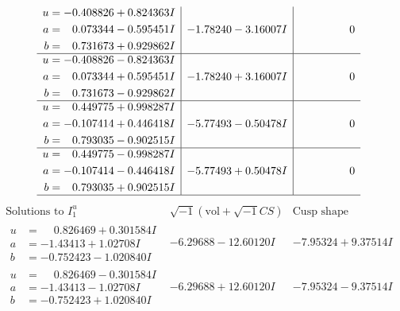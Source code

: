 \documentclass[1p]{elsarticle_modified}
\theoremstyle{definition}
\newcommand{\I}{\sqrt{-1}}
\begin{document}
$$\begin{array}{c|c|c}
\begin{aligned}
u &= -0.408826 + 0.824363 I \\
a &= \phantom{-}0.073344 - 0.595451 I \\
b &= \phantom{-}0.731673 + 0.929862 I\end{aligned}
 & -1.78240 - 3.16007 I & \phantom{-0.000000 } 0 \\ \hline\begin{aligned}
u &= -0.408826 - 0.824363 I \\
a &= \phantom{-}0.073344 + 0.595451 I \\
b &= \phantom{-}0.731673 - 0.929862 I\end{aligned}
 & -1.78240 + 3.16007 I & \phantom{-0.000000 } 0 \\ \hline\begin{aligned}
u &= \phantom{-}0.449775 + 0.998287 I \\
a &= -0.107414 + 0.446418 I \\
b &= \phantom{-}0.793035 - 0.902515 I\end{aligned}
 & -5.77493 - 0.50478 I & \phantom{-0.000000 } 0 \\ \hline\begin{aligned}
u &= \phantom{-}0.449775 - 0.998287 I \\
a &= -0.107414 - 0.446418 I \\
b &= \phantom{-}0.793035 + 0.902515 I\end{aligned}
 & -5.77493 + 0.50478 I & \phantom{-0.000000 } 0\\
 \hline 
 \end{array}$$\newpage$$\begin{array}{c|c|c}  
\text{Solutions to }I^u_{1}& \I (\text{vol} + \sqrt{-1}CS) & \text{Cusp shape}\\
 \hline 
\begin{aligned}
u &= \phantom{-}0.826469 + 0.301584 I \\
a &= -1.43413 + 1.02708 I \\
b &= -0.752423 - 1.020840 I\end{aligned}
 & -6.29688 - 12.60120 I & -7.95324 + 9.37514 I \\ \hline\begin{aligned}
u &= \phantom{-}0.826469 - 0.301584 I \\
a &= -1.43413 - 1.02708 I \\
b &= -0.752423 + 1.020840 I\end{aligned}
 & -6.29688 + 12.60120 I & -7.95324 - 9.37514 I \\ \hline\begin{aligned}

\end{aligned}
\end{array}$$
\end{document}
